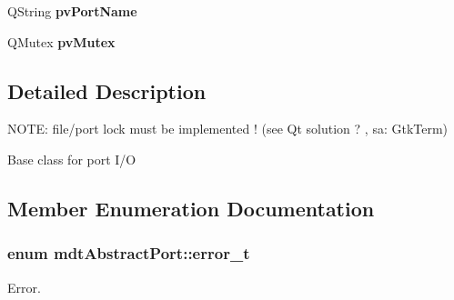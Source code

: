 \begin{DoxyCompactItemize}
\item 
\hypertarget{classmdt_abstract_port_afb8f8a723ff2db5141f18750020a7ee9}{
QString {\bfseries pvPortName}}
\label{classmdt_abstract_port_afb8f8a723ff2db5141f18750020a7ee9}

\item 
\hypertarget{classmdt_abstract_port_a357bce65bc031fffa87090a26ab88a08}{
QMutex {\bfseries pvMutex}}
\label{classmdt_abstract_port_a357bce65bc031fffa87090a26ab88a08}

\end{DoxyCompactItemize}


\subsection{Detailed Description}
NOTE: file/port lock must be implemented ! (see Qt solution ? , sa: GtkTerm) 

Base class for port I/O 

\subsection{Member Enumeration Documentation}
\hypertarget{classmdt_abstract_port_ad4121bb930c95887e77f8bafa065a85e}{
\subsubsection[{error\_\-t}]{\setlength{\rightskip}{0pt plus 5cm}enum {\bf mdtAbstractPort::error\_\-t}}}
\label{classmdt_abstract_port_ad4121bb930c95887e77f8bafa065a85e}


Error. 

